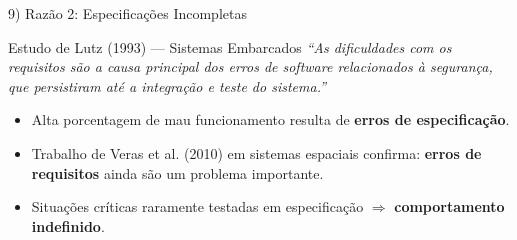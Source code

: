 \documentclass[aspectratio=169]{beamer}
\begin{document}
\begin{frame}{9) Razão 2: Especificações Incompletas}
  \begin{block}{Estudo de Lutz (1993) — Sistemas Embarcados}
    \textit{``As dificuldades com os requisitos são a causa principal dos erros de software relacionados à segurança, que persistiram até a integração e teste do sistema.''}
  \end{block}
  \vspace{0.4em}
  \begin{itemize}
    \item Alta porcentagem de mau funcionamento resulta de \textbf{erros de especificação}.
    \item Trabalho de Veras et al. (2010) em sistemas espaciais confirma: \textbf{erros de requisitos} ainda são um problema importante.
    \item Situações críticas raramente testadas em especificação $\Rightarrow$ \textbf{comportamento indefinido}.
  \end{itemize}
  \vspace{0.3em}
  \centering
\end{frame}
\end{document}
